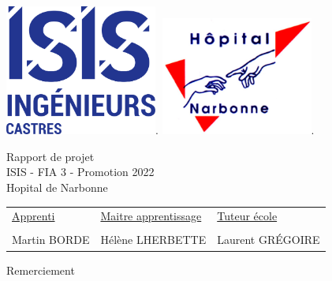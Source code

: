 \documentclass[11pt]{article}
\begin{document}
 
	\begin{titlepage}
		\includegraphics[width=5cm]{img/logo/ecole2.png}.
 		\hfill
		\includegraphics[width=5cm]{img/logo/hopital.png}.
		\begin{center} 
			\Huge 
			\vspace{2cm} 
			Rapport de projet\\
			\vspace{1cm} 
			\normalsize ISIS - FIA 3 - Promotion 2022\\
			\vspace{3cm} 
			Hopital de Narbonne 
		\end{center} 
		\vfill
		\begin{tabular}{p{6cm}p{6cm}p{6cm}} 
			\underline{Apprenti} & \underline{Maitre apprentissage} & \underline{Tuteur école}\\ 
			& & \\ 
			Martin BORDE & Hélène LHERBETTE & Laurent GRÉGOIRE \\
		\end{tabular}
	\end{titlepage} 

Remerciement \newpage
\end{document}
